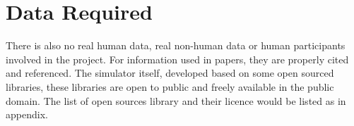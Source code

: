 \section{Data Required}
There is also no real human data, real non-human data or human participants involved in the project.
For information used in papers, they are properly cited and referenced.
The simulator itself, developed based on some open sourced libraries, these
libraries are open to public and freely available in the public domain.
The list of open sources library and their licence would be listed as in appendix.
